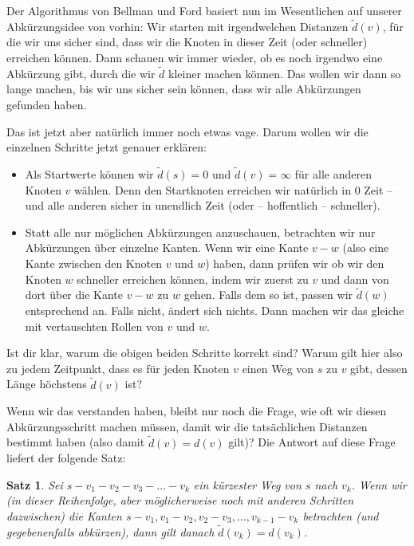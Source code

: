 \documentclass[a4paper,ngerman,12pt]{scrartcl}
\theoremstyle{definition}
\theoremstyle{plain}
\newtheorem{satz}[defn]{Satz}
\theoremstyle{remark}
\newcommand{\kante}[2]{#1{-}#2}
\begin{document}
Der Algorithmus von Bellman und Ford basiert nun im Wesentlichen auf unserer Abkürzungsidee von vorhin: Wir starten mit \glqq irgendwelchen\grqq{} Distanzen $\tilde{d}(v)$, für die wir uns sicher sind, dass wir die Knoten in dieser Zeit (oder schneller) erreichen können. Dann schauen wir immer wieder, ob es noch irgendwo eine Abkürzung gibt, durch die wir $\tilde{d}$ kleiner machen können. Das wollen wir dann so lange machen, bis wir uns sicher sein können, dass wir alle Abkürzungen gefunden haben.

Das ist jetzt aber natürlich immer noch etwas vage. Darum wollen wir die einzelnen Schritte jetzt genauer erklären:
\begin{itemize}
	\item Als Startwerte können wir $\tilde{d}(s) = 0$ und $\tilde{d}(v) = \infty$ für alle anderen Knoten $v$ wählen. Denn den Startknoten erreichen wir natürlich in $0$ Zeit -- und alle anderen sicher in unendlich Zeit (oder -- hoffentlich -- schneller).
	\item Statt alle nur möglichen Abkürzungen anzuschauen, betrachten wir nur Abkürzungen über einzelne Kanten. Wenn wir eine Kante $\kante{v}{w}$ (also eine Kante zwischen den Knoten $v$ und $w$) haben, dann prüfen wir ob wir den Knoten $w$ schneller erreichen können, indem wir zuerst zu $v$ und dann von dort über die Kante $\kante{v}{w}$ zu $w$ gehen. Falls dem so ist, passen wir $\tilde{d}(w)$ entsprechend an. Falls nicht, ändert sich nichts. Dann machen wir das gleiche mit vertauschten Rollen von $v$ und $w$.
\end{itemize}

Ist dir klar, warum die obigen beiden Schritte korrekt sind? Warum gilt hier also zu jedem Zeitpunkt, dass es für jeden Knoten $v$ einen Weg von $s$ zu $v$ gibt, dessen Länge höchstens $\tilde{d}(v)$ ist?

Wenn wir das verstanden haben, bleibt nur noch die Frage, wie oft wir diesen Abkürzungsschritt machen müssen, damit wir die tatsächlichen Distanzen bestimmt haben (also damit $\tilde{d}(v)=d(v)$ gilt)? Die Antwort auf diese Frage liefert der folgende Satz:

\begin{satz}
	Sei $s{-}v_1{-}v_2{-}v_3{-}\dots{-}v_k$ ein kürzester Weg von $s$ nach $v_k$. Wenn wir (in dieser Reihenfolge, aber möglicherweise noch mit anderen Schritten dazwischen) die Kanten $\kante{s}{v_1}, \kante{v_1}{v_2}, \kante{v_2}{v_3}, \dots, \kante{v_{k-1}}{v_k}$ betrachten (und gegebenenfalls abkürzen), dann gilt danach $\tilde{d}(v_k) = d(v_k)$.
\end{satz}
\end{document}
